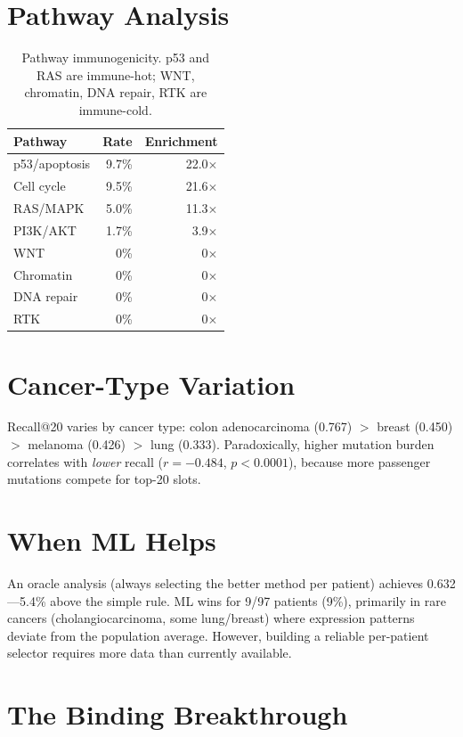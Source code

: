 \documentclass[11pt,twocolumn]{article}
\begin{document}
\section{Pathway Analysis}

\begin{table}[h]
\centering
\small
\begin{tabular}{lrr}
\toprule
\textbf{Pathway} & \textbf{Rate} & \textbf{Enrichment} \\
\midrule
p53/apoptosis & 9.7\% & 22.0$\times$ \\
Cell cycle & 9.5\% & 21.6$\times$ \\
RAS/MAPK & 5.0\% & 11.3$\times$ \\
PI3K/AKT & 1.7\% & 3.9$\times$ \\
WNT & 0\% & 0$\times$ \\
Chromatin & 0\% & 0$\times$ \\
DNA repair & 0\% & 0$\times$ \\
RTK & 0\% & 0$\times$ \\
\bottomrule
\end{tabular}
\caption{Pathway immunogenicity. p53 and RAS are immune-hot;
WNT, chromatin, DNA repair, RTK are immune-cold.}
\end{table}

\section{Cancer-Type Variation}

Recall@20 varies by cancer type: colon adenocarcinoma (0.767) $>$
breast (0.450) $>$ melanoma (0.426) $>$ lung (0.333). Paradoxically,
higher mutation burden correlates with \textit{lower} recall
($r = -0.484$, $p < 0.0001$), because more passenger mutations
compete for top-20 slots.

\section{When ML Helps}

An oracle analysis (always selecting the better method per patient)
achieves 0.632---5.4\% above the simple rule. ML wins for 9/97
patients (9\%), primarily in rare cancers (cholangiocarcinoma, some
lung/breast) where expression patterns deviate from the population
average. However, building a reliable per-patient selector requires
more data than currently available.

\section{The Binding Breakthrough}
\end{document}
